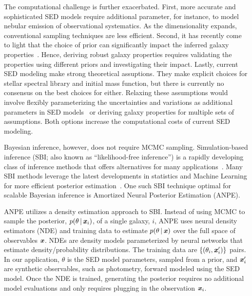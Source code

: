The computational challenge is further exacerbated. 
First, more accurate and sophisticated SED models require additional
parameter, for instance, to model nebular emission of observational systematics. 
As the dimensionality expands, conventional sampling techniques are less
efficient. 
Second, it has recently come to light that the choice of prior can
significantly impact the inferred galaxy
properties~\citep{carnall2018, leja2017, hahn2022}. 
Hence, deriving robust galaxy properties requires validating the properties
using different priors and investigating their impact. 
Lastly, current SED modeling make strong theoretical assuptions. 
They make explicit choices for stellar spectral library and initial mass
function, but there is currently no consensus on the best choices for either.
Relaxing these assumptions would involve flexibly parameterizing the
uncertainties and variations as additional parameters in SED
models~\citep{conroy2009, conroy2010c} or deriving galaxy properties for
multiple sets of assumptions. 
Both options increase the computational costs of current SED modeling.  

Bayesian inference, however, does not require MCMC sampling. 
Simulation-based inference (SBI; also known as ``likelihood-free inference'')
is a rapidly developing class of inference methods that offers alternatives for
many applications~\citep[see][and reference therein]{cranmer2020}.
Many SBI methods leverage the latest developments in statistics and Machine
Learning for more efficient posterior estimation~\citep{papamakarios2017,
alsing2019a, hahn2019c, dax2021, huppenkothen2021, zhang2021}. 
One such SBI technique optimal for scalable Bayesian inference is Amortized
Neural Posterior Estimation (ANPE). 

ANPE utilizes a density estimation approach to SBI. 
Instead of using MCMC to sample the posterior, $p(\theta \,|\, \textbf{\textit{x}}_i)$, 
of a single galaxy, $i$, ANPE uses neural density estimators (NDE) and training
data to estimate $p(\theta\,|\,\textbf{\textit{x}})$  over the full space of observables
$\textbf{\textit{x}}$.
NDEs are density models parameterized by neural networks that estimate
density/probability distributions. 
The training data are $\{(\theta_i, \textbf{\textit{x}}'_i)\}$ pairs.
In our application, $\theta$ is the SED model parameters, sampled from a 
prior, and $\textbf{\textit{x}}'_i$ are synthetic observables, such as photometry, forward
modeled using the SED model. 
Once the NDE is trained, generating the posterior requires no additional model
evaluations and only requires plugging in the observation $\textbf{\textit{x}}_i$.

